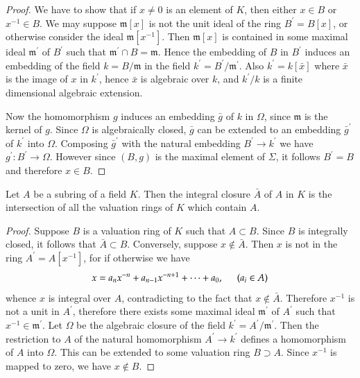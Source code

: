 \begin{proof}
We have to show that if $x\ne 0$ is an element of $K$, then either $x\in B$ or $x^{-1}\in B$. We may suppose $\mathfrak{m}[x]$ is not the unit ideal of the ring $B^\prime=B[x]$, or otherwise consider the ideal $\mathfrak{m}[x^{-1}]$. Then $\mathfrak{m}[x]$ is contained in some maximal ideal $\mathfrak{m}^\prime$ of $B^\prime$ such that $\mathfrak{m}^\prime\cap B=\mathfrak{m}$. Hence the embedding of $B$ in $B^\prime$ induces an embedding of the field $k=B/\mathfrak{m}$ in the field $k^\prime=B^\prime/\mathfrak{m}^\prime$. Also $k^\prime=k[\bar{x}]$ where $\bar{x}$ is the image of $x$ in $k^\prime$, hence $\bar{x}$ is algebraic over $k$, and $k^\prime/k$ is a finite dimensional algebraic extension.\par
Now the homomorphism $g$ induces an embedding $\bar{g}$ of $k$ in $\Omega$, since $\mathfrak{m}$ is the kernel of $g$. Since $\Omega$ is algebraically closed, $\bar{g}$ can be extended to an embedding $\bar{g}^\prime$ of $k^\prime$ into $\Omega$. Composing $\bar{g}^\prime$ with the natural embedding $B^\prime\to k^\prime$ we have $g^\prime:B^\prime\to\Omega$. However since $(B,g)$ is the maximal element of $\Sigma$, it follows $B^\prime=B$ and therefore $x\in B$.
\end{proof}
\begin{corollary}
Let $A$ be a subring of a field $K$. Then the integral closure $\bar{A}$ of $A$ in $K$ is the intersection of all the valuation rings of $K$ which contain $A$.
\end{corollary}
\begin{proof}
Suppose $B$ is a valuation ring of $K$ such that $A\subset B$. Since $B$ is integrally closed, it follows that $\bar{A}\subset B$. Conversely, suppose $x\notin\bar{A}$. Then $x$ is not in the ring $A^\prime=A[x^{-1}]$, for if otherwise we have 
$$
x=a_nx^{-n}+a_{n-1}x^{-n+1}+\cdots +a_0,\hspace{0.5cm}\left( a_i\in A \right) 
$$
whence $x$ is integral over $A$, contradicting to the fact that $x\notin\bar{A}$. Therefore $x^{-1}$ is not a unit in $A^\prime$, therefore there exists some maximal ideal $\mathfrak{m}^\prime$ of $A^\prime$ such that $x^{-1}\in\mathfrak{m}^\prime$. Let $\Omega$ be the algebraic closure of the field $k^\prime=A^\prime/\mathfrak{m}^\prime$. Then the restriction to $A$ of the natural homomorphism $A^\prime\to k^\prime$ defines a homomorphism of $A$ into $\Omega$. This can be extended to some valuation ring $B\supset A$. Since $x^{-1}$ is mapped to zero, we have $x\notin B$.
\end{proof}
